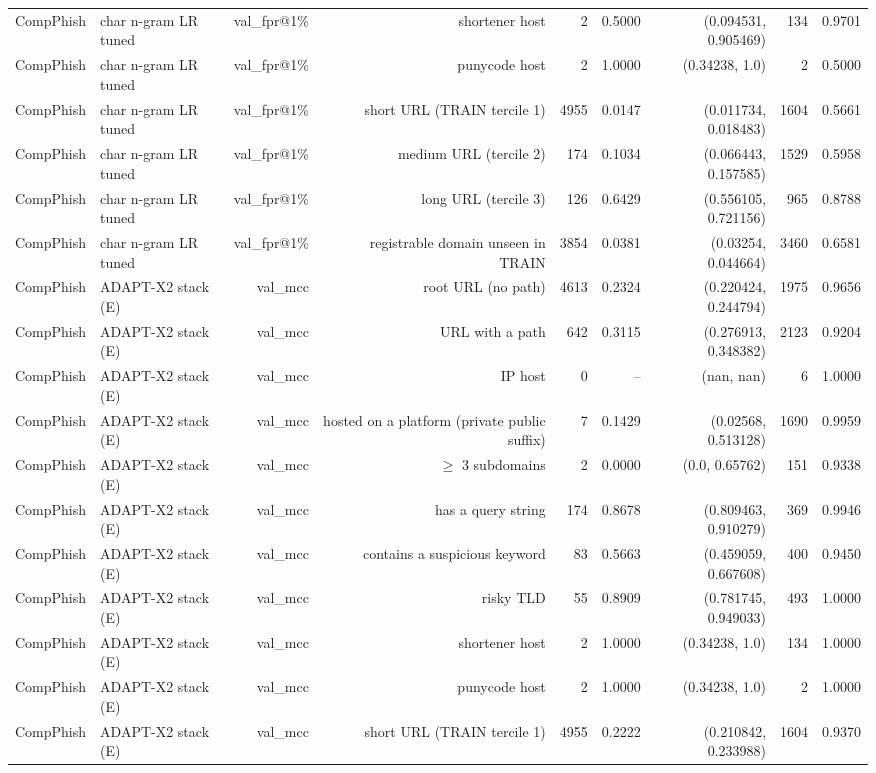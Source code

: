 \begin{table}[t]
\begin{tabular}{llrrrrrrr}
CompPhish & char n-gram LR tuned & val\_fpr@1\% & shortener host & 2 & 0.5000 & (0.094531, 0.905469) & 134 & 0.9701 \\
CompPhish & char n-gram LR tuned & val\_fpr@1\% & punycode host & 2 & 1.0000 & (0.34238, 1.0) & 2 & 0.5000 \\
CompPhish & char n-gram LR tuned & val\_fpr@1\% & short URL (TRAIN tercile 1) & 4955 & 0.0147 & (0.011734, 0.018483) & 1604 & 0.5661 \\
CompPhish & char n-gram LR tuned & val\_fpr@1\% & medium URL (tercile 2) & 174 & 0.1034 & (0.066443, 0.157585) & 1529 & 0.5958 \\
CompPhish & char n-gram LR tuned & val\_fpr@1\% & long URL (tercile 3) & 126 & 0.6429 & (0.556105, 0.721156) & 965 & 0.8788 \\
CompPhish & char n-gram LR tuned & val\_fpr@1\% & registrable domain unseen in TRAIN & 3854 & 0.0381 & (0.03254, 0.044664) & 3460 & 0.6581 \\
CompPhish & ADAPT-X2 stack (E) & val\_mcc & root URL (no path) & 4613 & 0.2324 & (0.220424, 0.244794) & 1975 & 0.9656 \\
CompPhish & ADAPT-X2 stack (E) & val\_mcc & URL with a path & 642 & 0.3115 & (0.276913, 0.348382) & 2123 & 0.9204 \\
CompPhish & ADAPT-X2 stack (E) & val\_mcc & IP host & 0 & -- & (nan, nan) & 6 & 1.0000 \\
CompPhish & ADAPT-X2 stack (E) & val\_mcc & hosted on a platform (private public suffix) & 7 & 0.1429 & (0.02568, 0.513128) & 1690 & 0.9959 \\
CompPhish & ADAPT-X2 stack (E) & val\_mcc & $\geq$ 3 subdomains & 2 & 0.0000 & (0.0, 0.65762) & 151 & 0.9338 \\
CompPhish & ADAPT-X2 stack (E) & val\_mcc & has a query string & 174 & 0.8678 & (0.809463, 0.910279) & 369 & 0.9946 \\
CompPhish & ADAPT-X2 stack (E) & val\_mcc & contains a suspicious keyword & 83 & 0.5663 & (0.459059, 0.667608) & 400 & 0.9450 \\
CompPhish & ADAPT-X2 stack (E) & val\_mcc & risky TLD & 55 & 0.8909 & (0.781745, 0.949033) & 493 & 1.0000 \\
CompPhish & ADAPT-X2 stack (E) & val\_mcc & shortener host & 2 & 1.0000 & (0.34238, 1.0) & 134 & 1.0000 \\
CompPhish & ADAPT-X2 stack (E) & val\_mcc & punycode host & 2 & 1.0000 & (0.34238, 1.0) & 2 & 1.0000 \\
CompPhish & ADAPT-X2 stack (E) & val\_mcc & short URL (TRAIN tercile 1) & 4955 & 0.2222 & (0.210842, 0.233988) & 1604 & 0.9370 \\

\end{tabular}
\end{table}
